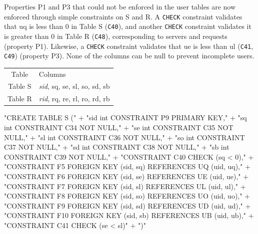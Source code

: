 \documentclass{article}
\def\nwendcode{\endtrivlist \endgroup}
\let\nwdocspar=\par
\theoremstyle{definition}
\begin{document}
Properties P1 and P3 that could not be enforced in the user tables are now
enforced through simple constraints on S and R.  A \texttt{CHECK} constraint
validates that \textsf{uq} is less than 0 in Table S ({\tt{}C40}), and another
\texttt{CHECK} constraint validates it is greater than 0 in Table R ({\tt{}C48}),
corresponding to servers and requests (property P1). Likewise, a \texttt{CHECK}
constraint validates that \textsf{ue} is less than \textsf{ul} ({\tt{}C41},
{\tt{}C49}) (property P3). None of the columns can be null to prevent incomplete
users.
\begin{table}[h]
\centering
\small
\begin{tabular}{|c|l|}
\hline
\rowcolor{TableTitle}
\multicolumn{2}{|c|}{User Constraint Tables}\\
\hline
\rowcolor{TableHeader}
Table & Columns \\
\hline
Table S & \textit{sid}, sq, se, sl, so, sd, sb \\
Table R & \textit{rid}, rq, re, rl, ro, rd, rb \\
\hline
\end{tabular}
\end{table}
\nwenddocs{}\endmoddef{}
"CREATE TABLE S ("
  + "sid int  CONSTRAINT P9 PRIMARY KEY,"
  + "sq  int  CONSTRAINT C34 NOT NULL,"
  + "se  int  CONSTRAINT C35 NOT NULL,"
  + "sl  int  CONSTRAINT C36 NOT NULL,"
  + "so  int  CONSTRAINT C37 NOT NULL,"
  + "sd  int  CONSTRAINT C38 NOT NULL,"
  + "sb  int  CONSTRAINT C39 NOT NULL,"
  + "CONSTRAINT C40 CHECK (sq < 0),"
  + "CONSTRAINT F5 FOREIGN KEY (sid, sq) REFERENCES UQ (uid, uq),"
  + "CONSTRAINT F6 FOREIGN KEY (sid, se) REFERENCES UE (uid, ue),"
  + "CONSTRAINT F7 FOREIGN KEY (sid, sl) REFERENCES UL (uid, ul),"
  + "CONSTRAINT F8 FOREIGN KEY (sid, so) REFERENCES UO (uid, uo),"
  + "CONSTRAINT F9 FOREIGN KEY (sid, sd) REFERENCES UD (uid, ud),"
  + "CONSTRAINT F10 FOREIGN KEY (sid, sb) REFERENCES UB (uid, ub),"
  + "CONSTRAINT C41 CHECK (se < sl)"
  + ")"
\nwendcode{}\nwdocspar
\nwenddocs{}\endmoddef{}
\end{document}
